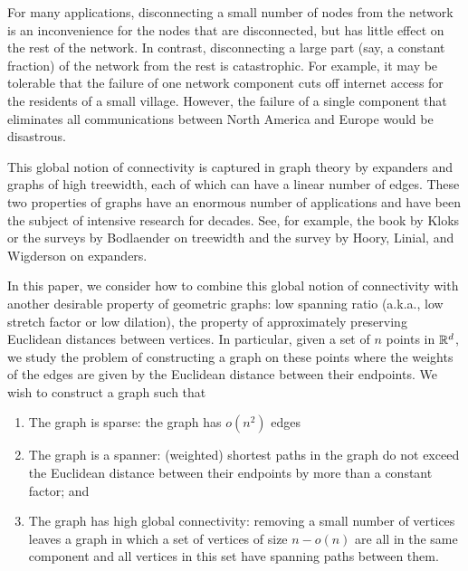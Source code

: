 \documentclass[final]{siamltex}
\begin{document}
For many applications, disconnecting a small number of nodes from the
network is an inconvenience for the nodes that are disconnected, but has
little effect on the rest of the network.  In contrast, disconnecting
a large part (say, a constant fraction) of the network from the rest
is catastrophic.
For example, it may be tolerable that the failure of one network component
cuts off internet access for the residents of a small village. However,
the failure of a single component that eliminates all communications
between North America and Europe would be disastrous.

This global notion of connectivity is captured in graph theory by
expanders and graphs of high treewidth, each of which can have a linear
number of edges.  These two properties of graphs have an enormous number
of applications and have been the subject of intensive research for
decades.  See, for example, the book by Kloks \cite{k94} or the surveys
by Bodlaender \cite{b98,b07} on treewidth and the survey by Hoory, Linial,
and Wigderson \cite{hlw06} on expanders.

In this paper, we consider how to combine this global notion of
connectivity with another desirable property of geometric graphs:
low spanning ratio (a.k.a., low stretch factor or low dilation),  the
property of approximately preserving Euclidean distances between vertices.
In particular, given a set of $n$ points in $\mathbb{R}^d$, we study the problem
of constructing a graph on these points where the weights of the edges
are given by the Euclidean distance between their endpoints. We wish
to construct a graph such that
\begin{enumerate}
  \item The graph is sparse: the graph has $o(n^2)$ edges
  \item The graph is a spanner: (weighted) shortest paths in the graph
    do not exceed the Euclidean distance between their endpoints by more
    than a constant factor; and
  \item The graph has high global connectivity: removing a small number
    of vertices leaves a graph in which a set of vertices of size $n-o(n)$
    are all in the same component and all vertices in this set have
    spanning paths between them.
\end{enumerate}
\end{document}
